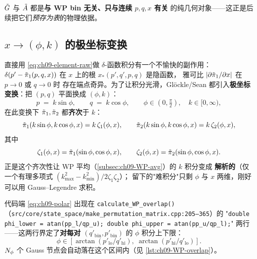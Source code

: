 \(\tilde{G}\) 与 \(\tilde{A}\) 都是\textbf{与 WP bin 无关、只与连续 \(p,q,x\) 有关}
的纯几何对象——这正是后续把它们\emph{预存为表}的物理依据。

\subsection{\texorpdfstring{$x\to(\phi,k)$}{x to phi-k} 的极坐标变换}
\label{subsec:ch09-polar-coordinates}

直接用 \eqref{eq:ch09-element-raw}做 \(\delta\)-函数积分有一个不愉快的副作用：
\(\delta(p'-\tilde{\pi}_{1}(p,q,x))\) 在 \(x\) 上的根 \(x_*(p',q',p,q)\) 是隐函数，
雅可比 \(\abs{\partial \tilde{\pi}_{1}/\partial x}\) 在 \(p\to 0\) 或 \(q\to 0\) 时
存在端点奇异。为了让积分光滑，Glöckle/Sean 都引入\textbf{极坐标变换}：把
\((p,q)\) 平面换成 \((\phi, k)\)：
\begin{equation}
\label{eq:ch09-polar}
p \;=\; k\sin\phi, \qquad q \;=\; k\cos\phi, \qquad
\phi\in(0,\tfrac{\pi}{2}),\quad k\in[0,\infty),
\end{equation}
在此变换下 \(\tilde{\pi}_{1}, \tilde{\pi}_{2}\) 都\textbf{齐次}于 \(k\)：
\begin{equation}
\tilde{\pi}_{1}(k\sin\phi, k\cos\phi, x) = k\,\zeta_1(\phi,x),\qquad
\tilde{\pi}_{2}(k\sin\phi, k\cos\phi, x) = k\,\zeta_2(\phi,x),
\end{equation}
其中
\begin{equation}
\zeta_1(\phi,x) = \tilde{\pi}_{1}(\sin\phi,\cos\phi,x),\qquad
\zeta_2(\phi,x) = \tilde{\pi}_{2}(\sin\phi,\cos\phi,x).
\end{equation}
正是这个齐次性让 WP 平均（\cref{subsec:ch09-WP-avg}）的 \(k\) 积分变成
\textbf{解析的}（仅一个有理多项式 \((k_{\max}^2-k_{\min}^2)/2\zeta_1\zeta_2\)）；
留下的"难积分"只剩 \(\phi\) 与 \(x\) 两维，刚好可以用 Gauss--Legendre 求积。

代码端 \eqref{eq:ch09-polar} 出现在 \texttt{calculate\_WP\_overlap()}
（\texttt{src/core/state\_space/make\_permutation\_matrix.cpp:205--365}）的
"\texttt{double phi\_lower = atan(pp\_l/qp\_u); double phi\_upper = atan(pp\_u/qp\_l);}"
两行——这两行界定了\textbf{对每对 \((q'_{\text{bin}}, p'_{\text{bin}})\)}
的 \(\phi\) 积分上下限：
\begin{equation}
\phi\in[\arctan(p'_{\text{lo}}/q'_{\text{hi}}),\;\arctan(p'_{\text{hi}}/q'_{\text{lo}})].
\end{equation}
\(N_{\phi}\) 个 Gauss 节点会自动落在这个区间内（见 \cref{lst:ch09-WP-overlap}）。

